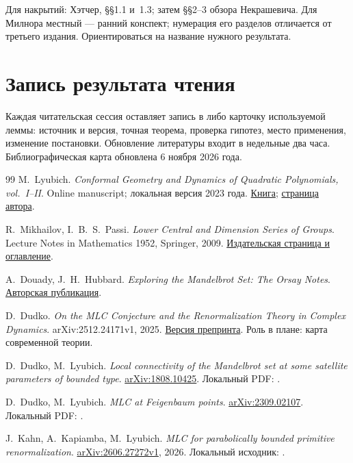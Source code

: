 Для накрытий: Хэтчер, §§1.1 и~1.3; затем §§2--3 обзора Некрашевича.
Для Милнора местный  --- ранний конспект;
нумерация его разделов отличается от третьего издания. Ориентироваться
на название нужного результата.

\section{Запись результата чтения}
Каждая читательская сессия оставляет запись в
 либо карточку используемой леммы:
источник и версия, точная теорема, проверка гипотез, место применения,
изменение постановки. Обновление литературы входит в недельные два часа.
Библиографическая карта обновлена 6 ноября 2026 года.

\begin{thebibliography}{99}\small
{}
M.~Lyubich. \emph{Conformal Geometry and Dynamics of Quadratic Polynomials,
vol.~I--II}. Online manuscript; локальная версия 2023 года.
\href{https://www.math.stonybrook.edu/~mlyubich/book.pdf}{Книга};
\href{https://www.math.stonybrook.edu/~mlyubich/papers/index.html}{страница автора}.

R.~Mikhailov, I.~B.~S.~Passi.
\emph{Lower Central and Dimension Series of Groups}.
Lecture Notes in Mathematics 1952, Springer, 2009.
\href{https://link.springer.com/book/10.1007/978-3-540-85818-8}{Издательская страница и оглавление}.

A.~Douady, J.~H.~Hubbard.
\emph{Exploring the Mandelbrot Set: The Orsay Notes}.
\href{https://pi.math.cornell.edu/~hubbard/OrsayEnglish.pdf}{Авторская публикация}.

D.~Dudko. \emph{On the MLC Conjecture and the Renormalization Theory
in Complex Dynamics}. arXiv:2512.24171v1, 2025.
\href{https://arxiv.org/abs/2512.24171}{Версия препринта}.
Роль в плане: карта современной теории.

D.~Dudko, M.~Lyubich. \emph{Local connectivity of the Mandelbrot set
at some satellite parameters of bounded type}.
\href{https://arxiv.org/abs/1808.10425}{arXiv:1808.10425}.
Локальный PDF: .

D.~Dudko, M.~Lyubich. \emph{MLC at Feigenbaum points}.
\href{https://arxiv.org/abs/2309.02107}{arXiv:2309.02107}.
Локальный PDF: .

J.~Kahn, A.~Kapiamba, M.~Lyubich.
\emph{MLC for parabolically bounded primitive renormalization}.
\href{https://arxiv.org/abs/2606.27272}{arXiv:2606.27272v1}, 2026.
Локальный исходник: .


\end{thebibliography}
